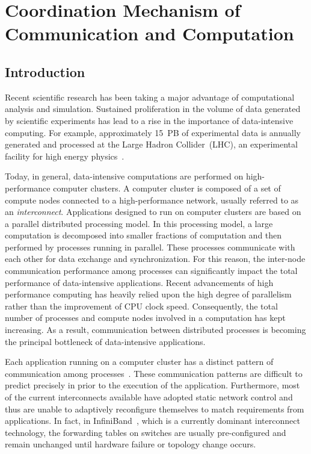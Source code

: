 \chapter{Coordination Mechanism of Communication and Computation}\label{sec:iv}

\section{Introduction}\label{sec:iv-introduction}

Recent scientific research has been taking a major advantage of
computational analysis and simulation. Sustained proliferation in the volume of
data generated by scientific experiments has lead to a rise in the
importance of data-intensive computing. For example, approximately 15~PB
of experimental data is annually generated and processed at the Large
Hadron Collider~(LHC), an experimental facility for high energy
physics~\autocite{Bird2011}.

Today, in general, data-intensive computations are performed on
high-performance computer clusters. A computer cluster is composed of a
set of compute nodes connected to a high-performance network, usually
referred to as an \emph{interconnect}. Applications designed to run on
computer clusters are based on a parallel distributed processing model.
In this processing model, a large computation is decomposed into smaller
fractions of computation and then performed by processes running in
parallel. These processes communicate with each other for data exchange
and synchronization. For this reason, the inter-node communication
performance among processes can significantly impact the total
performance of data-intensive applications. Recent advancements of high
performance computing has heavily relied upon the high degree of
parallelism rather than the improvement of CPU clock speed.
Consequently, the total number of processes and compute nodes involved
in a computation has kept increasing. As a result, communication between
distributed processes is becoming the principal bottleneck of
data-intensive applications.

Each application running on a computer cluster has a distinct pattern of
communication among processes~\autocite{Kamil2010}. These communication
patterns are difficult to predict precisely in prior to the execution of
the application. Furthermore, most of the current interconnects
available have adopted static network control and thus are unable to
adaptively reconfigure themselves to match requirements from
applications. In fact, in InfiniBand~\autocite{Buyya2009}, which is
a currently dominant interconnect technology, the forwarding tables on
switches are usually pre-configured and remain unchanged until hardware
failure or topology change occurs.

